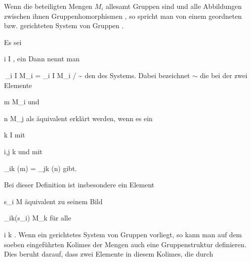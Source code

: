 Wenn die beteiligten Mengen $M_i$ allesamt Gruppen
 {} {}
sind und alle Abbildungen zwischen ihnen Gruppenhomorphismen
 {} {,}
so spricht man von einem geordneten bzw. gerichteten System von Gruppen
 {} {.}


{}
{





Es sei

 {}
 {i \in I} {}
 {} {} {} {,}
ein
Dann nennt man

\mavergleichskettedisp
{\vergleichskette
{ \,_{i \in I} M_i
}
{ =} { \biguplus_{i \in I} M_i / \sim
}
{ } {
}
{ } {
}
{ } {
}
}
{}{}{}
den 
 {} {}
des Systems. Dabei bezeichnet $\sim$ die
bei der zwei Elemente

\mavergleichskette
{\vergleichskette
{ m
}
{ \in }{ M_i
}
{  }{
}
{    }{
}
{   }{
}
}
{}{}{}
und

\mavergleichskette
{\vergleichskette
{ n
}
{ \in }{ M_j
}
{  }{
}
{    }{
}
{   }{
}
}
{}{}{}
als äquivalent erklärt werden, wenn es ein

\mavergleichskette
{\vergleichskette
{ k
}
{ \in }{ I
}
{  }{
}
{    }{
}
{   }{
}
}
{}{}{}
mit

\mavergleichskette
{\vergleichskette
{ i,j
}
{ \preccurlyeq }{ k
}
{  }{
}
{    }{
}
{   }{
}
}
{}{}{}
und mit

\mavergleichskettedisp
{\vergleichskette
{ \varphi_{ik} (m)
}
{ =} { \varphi_{jk} (n)
}
{ } {
}
{ } {
}
{ } {
}
}
{}{}{}
gibt.





}

Bei dieser Definition ist insbesondere ein Element

\mavergleichskette
{\vergleichskette
{ s_i
}
{ \in }{ M
}
{  }{
}
{    }{
}
{   }{
}
}
{}{}{}
äquivalent zu seinem Bild

\mavergleichskette
{\vergleichskette
{ \varphi_{ik}(s_i)
}
{ \in }{ M_k
}
{  }{
}
{    }{
}
{   }{
}
}
{}{}{}
für alle

\mavergleichskette
{\vergleichskette
{ i
}
{ \preccurlyeq }{ k
}
{  }{
}
{    }{
}
{   }{
}
}
{}{}{.}
Wenn ein gerichtetes System von Gruppen
 {} {}
vorliegt, so kann man auf dem soeben eingeführten Kolimes der Mengen auch eine Gruppenstruktur
 {} {}
definieren. Dies beruht darauf, dass zwei Elemente in diesem Kolimes, die durch

